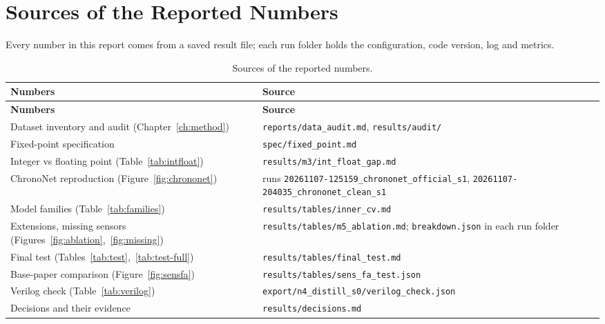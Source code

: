 \section{Sources of the Reported Numbers}

Every number in this report comes from a saved result file; each run folder holds the configuration, code version,
log and metrics.

\begin{xltabular}{\textwidth}{@{}P{62mm}L@{}}
\caption{Sources of the reported numbers.}\label{tab:sources}\\
\toprule
\textbf{Numbers} & \textbf{Source}\\
\midrule
\endfirsthead
\toprule
\textbf{Numbers} & \textbf{Source}\\
\midrule
\endhead
\bottomrule
\endlastfoot
\small Dataset inventory and audit (Chapter~\ref{ch:method}) & \small \texttt{reports/data\_audit.md},
\texttt{results/audit/}\\
\small Fixed-point specification & \small \texttt{spec/fixed\_point.md}\\
\small Integer vs floating point (Table~\ref{tab:intfloat}) & \small \texttt{results/m3/int\_float\_gap.md}\\
\small ChronoNet reproduction (Figure~\ref{fig:chrononet}) & \small runs \texttt{20261107-125159\_chrononet\_official\_s1},
\texttt{20261107-204035\_chrononet\_clean\_s1}\\
\small Model families (Table~\ref{tab:families}) & \small \texttt{results/tables/inner\_cv.md}\\
\small Extensions, missing sensors (Figures~\ref{fig:ablation},~\ref{fig:missing}) & \small
\texttt{results/tables/m5\_ablation.md}; \texttt{breakdown.json} in each run folder\\
\small Final test (Tables~\ref{tab:test},~\ref{tab:test-full}) & \small \texttt{results/tables/final\_test.md}\\
\small Base-paper comparison (Figure~\ref{fig:sensfa}) & \small \texttt{results/tables/sens\_fa\_test.json}\\
\small Verilog check (Table~\ref{tab:verilog}) & \small \texttt{export/n4\_distill\_s0/verilog\_check.json}\\
\small Decisions and their evidence & \small \texttt{results/decisions.md}\\
\end{xltabular}
